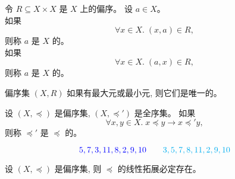 \begin{frame}{}
  \begin{definition}
    令 $R \subseteq X \times X$ 是 $X$ 上的偏序。
    设 $a \in X$。\\[5pt]

    \pause
    如果
    \[
      \forall x \in X.\; (x, a) \in R,
    \]
    则称 $a$ 是 $X$ 的。\\[10pt]

    \pause
    如果
    \[
      \forall x \in X.\; (a, x) \in R,
    \]
    则称 $a$ 是 $X$ 的。
  \end{definition}

  \pause
  \begin{center}
  \end{center}
\end{frame}

\begin{frame}{}
  \begin{theorem}
    偏序集 $(X, R)$ 如果有最大元或最小元, 则它们是唯一的。
  \end{theorem}
\end{frame}

\begin{frame}{}
  \begin{definition}
    设 $(X, \preceq)$ 是偏序集, $(X, \preceq')$ 是全序集。
    如果
    \[
      \forall x, y \in X.\; x \preceq y \to x \preceq' y,
    \]
    则称 $\preceq'$ 是 $\preceq$ 的。
  \end{definition}


  \pause
  \vspace{-0.50cm}
  \[
    \textcolor{blue}{5, 7, 3, 11, 8, 2, 9, 10} \qquad \textcolor{cyan}{3, 5, 7, 8, 11, 2, 9, 10}
  \]
\end{frame}

\begin{frame}{}
  \begin{theorem}
    设 $(X, \preceq)$ 是偏序集, 则 $\preceq$ 的线性拓展必定存在。
  \end{theorem}

\end{frame}
